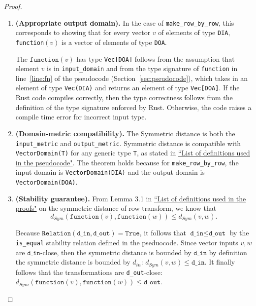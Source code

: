 \documentclass[11pt,a4paper]{article}
\newcommand{\grace}[1]{{ {\color{purple}{(grace)~#1}}}}
\newcommand{\din}{\texttt{d\_in}}
\newcommand{\dout}{\texttt{d\_out}}
\newcommand{\Relation}{\texttt{Relation}}
\newcommand{\function}{\texttt{function}}
\begin{document}
\begin{proof}
\begin{enumerate}
\item \textbf{(Appropriate output domain).} In the case of \texttt{make\_row\_by\_row}, this corresponds to showing that for every vector $v$ of elements of type \texttt{DIA}, \texttt{function}$(v)$ is a vector of elements of type \texttt{DOA}. 

The $\function(v)$ has type \texttt{Vec[DOA]} follows from the assumption that element $v$ is in \texttt{input\_domain} and from the type signature of \texttt{function} in line~\ref{line:fn} of the pseudocode (Section~\ref{sec:pseudocode}), which takes in an element of type \texttt{Vec(DIA)} and returns an element of type \texttt{Vec[DOA]}. If the Rust code compiles correctly, then the type correctness follows from the definition of the type signature enforced by Rust. Otherwise, the code raises a compile time error for incorrect input type. \grace{Silvia wrote that it raises compile time error for incorrect input type, does it do the same for incorrect output type?}


\grace{I think checking type signature is sufficient for this pf.}

\item \textbf{(Domain-metric compatibility).} The Symmetric distance is both the \texttt{input\_metric} and \texttt{output\_metric}. Symmetric distance is compatible with \texttt{VectorDomain(T)} for any generic type \texttt{T}, as stated in \href{https://www.overleaf.com/project/60d215bf90b337ac02200a99}{``List of definitions used in the pseudocode"}. The theorem holds because for \texttt{make\_row\_by\_row}, the input domain is \texttt{VectorDomain(DIA)} and the output domain is \texttt{VectorDomain(DOA)}. 


\item \textbf{(Stability guarantee).} From Lemma 3.1 in \href{https://www.overleaf.com/project/60d214e390b337703d200982}{``List of definitions used in the proofs"} on the symmetric distance of row transform, we know that $$d_{Sym}(\texttt{function}(v), \texttt{function}(w)) \leq d_{Sym}(v, w).$$

Because $\Relation(\din, \dout) = \texttt{True}$, it follows that $\din \leq \dout$ by the \texttt{is\_equal} stability relation defined in the pseduocode. Since vector inputs $v, w$ are $\din$-close, then the symmetric distance is bounded by $\din$ by definition the symmetric distance is bounded by $d_{in}$: $d_{Sym}(v, w) \leq \din$. It finally follows that the transformations are \dout-close: $d_{Sym}(\function(v), \function(w)) \leq \dout$.
\end{enumerate}
\end{proof}
\end{document}
